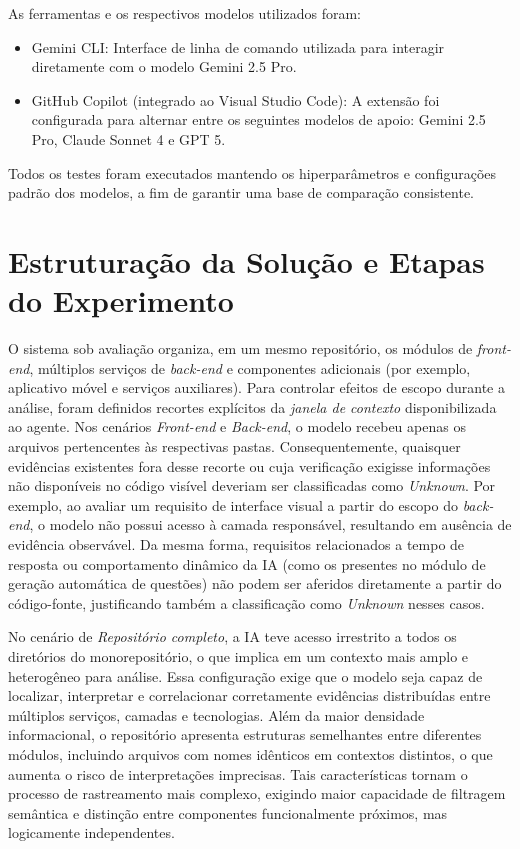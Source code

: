 As ferramentas e os respectivos modelos utilizados foram:

\begin{itemize}
    \item Gemini CLI: Interface de linha de comando utilizada para interagir diretamente com o modelo Gemini 2.5 Pro.
    \item GitHub Copilot (integrado ao Visual Studio Code): A extensão foi configurada para alternar entre os seguintes modelos de apoio: Gemini 2.5 Pro, Claude Sonnet 4 e GPT 5.
\end{itemize}

Todos os testes foram executados mantendo os hiperparâmetros e configurações padrão dos modelos, a fim de garantir uma base de comparação consistente.


\section{Estruturação da Solução e Etapas do Experimento}
O sistema sob avaliação organiza, em um mesmo repositório, os módulos de \textit{front-end}, múltiplos serviços de \textit{back-end} e componentes adicionais (por exemplo, aplicativo móvel e serviços auxiliares). Para controlar efeitos de escopo durante a análise, foram definidos recortes explícitos da \textit{janela de contexto} disponibilizada ao agente. Nos cenários \textit{Front-end} e \textit{Back-end}, o modelo recebeu apenas os arquivos pertencentes às respectivas pastas. Consequentemente, quaisquer evidências existentes fora desse recorte ou cuja verificação exigisse informações não disponíveis no código visível deveriam ser classificadas como \textit{Unknown}. Por exemplo, ao avaliar um requisito de interface visual a partir do escopo do \textit{back-end}, o modelo não possui acesso à camada responsável, resultando em ausência de evidência observável. Da mesma forma, requisitos relacionados a tempo de resposta ou comportamento dinâmico da IA (como os presentes no módulo de geração automática de questões) não podem ser aferidos diretamente a partir do código-fonte, justificando também a classificação como \textit{Unknown} nesses casos.

No cenário de \textit{Repositório completo}, a IA teve acesso irrestrito a todos os diretórios do monorepositório, o que implica em um contexto mais amplo e heterogêneo para análise. Essa configuração exige que o modelo seja capaz de localizar, interpretar e correlacionar corretamente evidências distribuídas entre múltiplos serviços, camadas e tecnologias. Além da maior densidade informacional, o repositório apresenta estruturas semelhantes entre diferentes módulos, incluindo arquivos com nomes idênticos em contextos distintos, o que aumenta o risco de interpretações imprecisas. Tais características tornam o processo de rastreamento mais complexo, exigindo maior capacidade de filtragem semântica e distinção entre componentes funcionalmente próximos, mas logicamente independentes.

